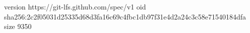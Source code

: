 version https://git-lfs.github.com/spec/v1
oid sha256:2c2f05031d25335d68d3fa16c69c4fbc1db97f31e4d2a24c3c58e71540184dfa
size 9350
